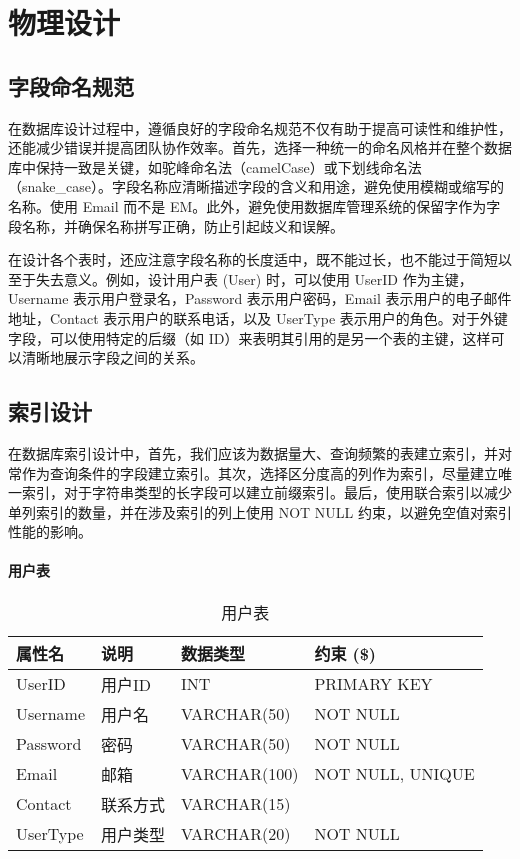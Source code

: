 \section{物理设计}

\subsection{字段命名规范}

在数据库设计过程中，遵循良好的字段命名规范不仅有助于提高可读性和维护性，还能减少错误并提高团队协作效率。首先，选择一种统一的命名风格并在整个数据库中保持一致是关键，如驼峰命名法（camelCase）或下划线命名法（snake\_case）。字段名称应清晰描述字段的含义和用途，避免使用模糊或缩写的名称。使用 Email 而不是 EM。此外，避免使用数据库管理系统的保留字作为字段名称，并确保名称拼写正确，防止引起歧义和误解。

在设计各个表时，还应注意字段名称的长度适中，既不能过长，也不能过于简短以至于失去意义。例如，设计用户表 (User) 时，可以使用 UserID 作为主键，Username 表示用户登录名，Password 表示用户密码，Email 表示用户的电子邮件地址，Contact 表示用户的联系电话，以及 UserType 表示用户的角色。对于外键字段，可以使用特定的后缀（如 ID）来表明其引用的是另一个表的主键，这样可以清晰地展示字段之间的关系。

\subsection{索引设计}

在数据库索引设计中，首先，我们应该为数据量大、查询频繁的表建立索引，并对常作为查询条件的字段建立索引。其次，选择区分度高的列作为索引，尽量建立唯一索引，对于字符串类型的长字段可以建立前缀索引。最后，使用联合索引以减少单列索引的数量，并在涉及索引的列上使用 NOT NULL 约束，以避免空值对索引性能的影响。

\paragraph{用户表}

\begin{table}[!hpt]
    \caption{用户表}
    \label{tab:rela-user}
    \centering
    \begin{tabular}{@{}llll@{}} \toprule
        \textbf{属性名} & \textbf{说明} & \textbf{数据类型} & \textbf{约束} (\$) \\ \midrule
        UserID & 用户ID & INT & PRIMARY KEY \\
        Username & 用户名 & VARCHAR(50) & NOT NULL \\
        Password & 密码 & VARCHAR(50) & NOT NULL \\
        Email & 邮箱 & VARCHAR(100) & NOT NULL, UNIQUE \\
        Contact & 联系方式 & VARCHAR(15) &  \\
        UserType & 用户类型 & VARCHAR(20) & NOT NULL \\ \bottomrule
    \end{tabular}
\end{table}


